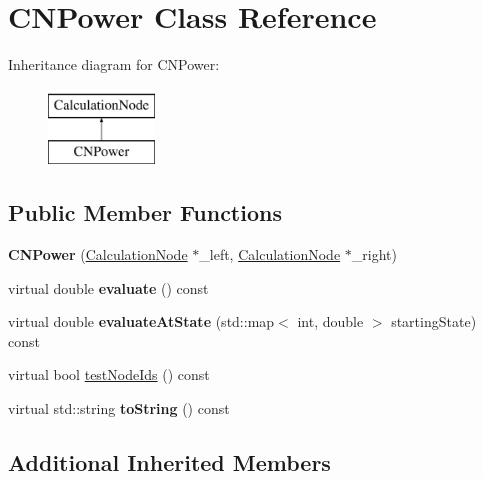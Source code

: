 \hypertarget{classCNPower}{}\section{C\+N\+Power Class Reference}
\label{classCNPower}
Inheritance diagram for C\+N\+Power\+:\begin{figure}[H]
\begin{center}
\leavevmode
\includegraphics[height=2.000000cm]{classCNPower}
\end{center}
\end{figure}
\subsection*{Public Member Functions}
\begin{DoxyCompactItemize}
\item 
{\bfseries C\+N\+Power} (\hyperlink{classCalculationNode}{Calculation\+Node} $\ast$\+\_\+left, \hyperlink{classCalculationNode}{Calculation\+Node} $\ast$\+\_\+right)\hypertarget{classCNPower_ac5ba8a91170451bc06afbf7153d7f707}{}\label{classCNPower_ac5ba8a91170451bc06afbf7153d7f707}

\item 
virtual double {\bfseries evaluate} () const \hypertarget{classCNPower_a9461646cf8e9fc0cb54318e04d73ed72}{}\label{classCNPower_a9461646cf8e9fc0cb54318e04d73ed72}

\item 
virtual double {\bfseries evaluate\+At\+State} (std\+::map$<$ int, double $>$ starting\+State) const \hypertarget{classCNPower_af4a31cbe51bc44fba203bda91d46384f}{}\label{classCNPower_af4a31cbe51bc44fba203bda91d46384f}

\item 
virtual bool \hyperlink{classCNPower_a3d1e004e5e71954037b2ea46f54cd438}{test\+Node\+Ids} () const 
\item 
virtual std\+::string {\bfseries to\+String} () const \hypertarget{classCNPower_a5d9c427cba2ea13f2bf91ecadcac50ef}{}\label{classCNPower_a5d9c427cba2ea13f2bf91ecadcac50ef}

\end{DoxyCompactItemize}
\subsection*{Additional Inherited Members}


